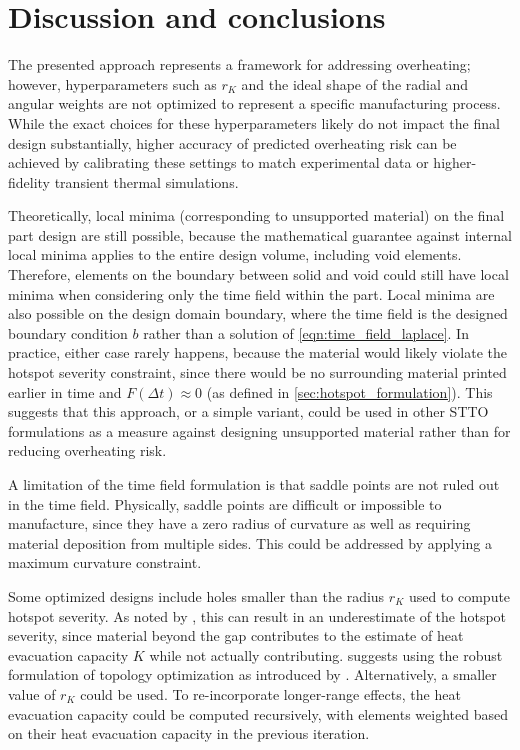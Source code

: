\documentclass{article}
\begin{document}
\section{Discussion and conclusions}

The presented approach represents a framework for addressing overheating; however, hyperparameters such as $r_K$ and the ideal shape of the radial and angular weights are not optimized to represent a specific manufacturing process. While the exact choices for these hyperparameters likely do not impact the final design substantially, higher accuracy of predicted overheating risk can be achieved by calibrating these settings to match experimental data or higher-fidelity transient thermal simulations.

Theoretically, local minima (corresponding to unsupported material) on the final part design are still possible, because the mathematical guarantee against internal local minima applies to the entire design volume, including void elements.
Therefore, elements on the boundary between solid and void could still have local minima when considering only the time field within the part.
Local minima are also possible on the design domain boundary, where the time field is the designed boundary condition $b$ rather than a solution of \autoref{eqn:time_field_laplace}.
In practice, either case rarely happens, because the material would likely violate the hotspot severity constraint, since there would be no surrounding material printed earlier in time and $F(\Delta t) \approx 0$ (as defined in \autoref{sec:hotspot_formulation}).
This suggests that this approach, or a simple variant, could be used in other STTO formulations as a measure against designing unsupported material rather than for reducing overheating risk.

A limitation of the time field formulation is that saddle points are not ruled out in the time field.
Physically, saddle points are difficult or impossible to manufacture, since they have a zero radius of curvature as well as requiring material deposition from multiple sides.
This could be addressed by applying a maximum curvature constraint.

Some optimized designs include holes smaller than the radius $r_K$ used to compute hotspot severity.
As noted by \cite{das2025overheating}, this can result in an underestimate of the hotspot severity, since material beyond the gap contributes to the estimate of heat evacuation capacity $K$ while not actually contributing.
\cite{das2025overheating} suggests using the robust formulation of topology optimization as introduced by \cite{Wang2011RobustProjection}.
Alternatively, a smaller value of $r_K$ could be used.
To re-incorporate longer-range effects, the heat evacuation capacity could be computed recursively, with elements weighted based on their heat evacuation capacity in the previous iteration.
\end{document}

